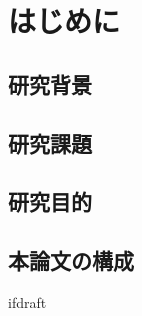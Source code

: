 \documentclass{jsarticle}
\begin{document}
    \fi

    \section{はじめに}

    \subsection{研究背景}
    \subsection{研究課題}
    \subsection{研究目的}
    \subsection{本論文の構成}


    \expandafter\ifx\csname ifdraft\endcsname\relax
\end{document}
